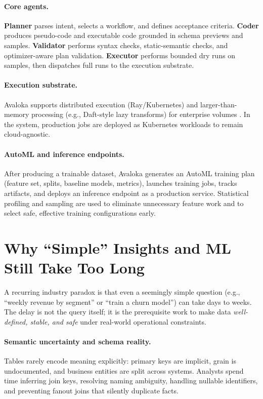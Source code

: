 \documentclass{article} %
\begin{document}
\paragraph{Core agents.}
\textbf{Planner} parses intent, selects a workflow, and defines acceptance criteria.
\textbf{Coder} produces pseudo-code and executable code grounded in schema previews and samples.
\textbf{Validator} performs syntax checks, static-semantic checks, and optimizer-aware plan validation.
\textbf{Executor} performs bounded dry runs on samples, then dispatches full runs to the execution substrate.

\paragraph{Execution substrate.}
Avaloka supports distributed execution (Ray/Kubernetes) and larger-than-memory processing (e.g., Daft-style
lazy transforms) for enterprise volumes \citep{ray,daft}. In the system, production jobs are deployed as
Kubernetes workloads to remain cloud-agnostic.

\paragraph{AutoML and inference endpoints.}
After producing a trainable dataset, Avaloka generates an AutoML training plan (feature set, splits,
baseline models, metrics), launches training jobs, tracks artifacts, and deploys an inference endpoint as
a production service. Statistical profiling and sampling are used to eliminate unnecessary feature work and
to select safe, effective training configurations early.

\section{Why ``Simple'' Insights and ML Still Take Too Long}
\label{sec:why_slow}
A recurring industry paradox is that even a seemingly simple question (e.g., ``weekly revenue by
segment'' or ``train a churn model'') can take days to weeks. The delay is not the query itself; it is
the prerequisite work to make data \emph{well-defined, stable, and safe} under real-world operational
constraints.

\paragraph{Semantic uncertainty and schema reality.}
Tables rarely encode meaning explicitly: primary keys are implicit, grain is undocumented, and
business entities are split across systems. Analysts spend time inferring join keys, resolving naming
ambiguity, handling nullable identifiers, and preventing fanout joins that silently duplicate facts.
\end{document}
